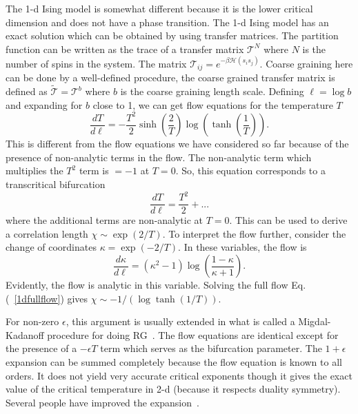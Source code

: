 \documentclass[
 reprint,
 amsmath,amssymb,
 aps, superscriptaddress, pre
]{revtex4-1}
\begin{document}
The 1-d Ising model is somewhat different because it is the lower critical dimension and does not have a phase transition. The 1-d Ising model has an exact solution which can be obtained by using transfer matrices. The partition function can be written as the trace of a transfer matrix $\mathcal{T}^N$ where $N$ is the number of spins in the system. The matrix $\mathcal{T}_{i j} = e^{-\beta \mathcal{H}(s_i s_j)}$. Coarse graining here can be done by a well-defined procedure, the coarse grained transfer matrix is defined as $\tilde{\mathcal{T}} = \mathcal{T}^b$ where $b$ is the coarse graining length scale. Defining $\ell = \log b$ and expanding for $b$ close to 1, we can get flow equations for the temperature $T$
\begin{equation}
 \frac{d T}{d \ell} = - \frac{T^2}{2} \sinh \left(\frac{2}{T} \right) \log \left (\tanh \left(\frac{1}{T}\right) \right) .
 \label{1dfullflow}
\end{equation}
This is different from the flow equations we have considered so far because of the presence of non-analytic terms in the flow. The non-analytic term which multiplies the $T^2$ term is $= -1$ at $T = 0$. So, this equation corresponds to a transcritical bifurcation
\begin{equation}
 \frac{d T}{d \ell} =  \frac{T^2}{2} + ...
\end{equation}
where the additional terms are non-analytic at $T = 0$. This can be used to derive a correlation length $\chi \sim \exp(2/T)$.  To interpret the flow further, consider the change of coordinates $\kappa = \exp(-2/T)$. In these variables, the flow is 
\begin{equation}
 \frac{d \kappa}{d \ell} = (\kappa^2 - 1) \log \left( \frac{1-\kappa}{\kappa + 1} \right) .
\end{equation}
Evidently, the flow is analytic in this variable. Solving the full flow Eq.(~\ref{1dfullflow}) gives $\chi \sim -1/(\log \tanh(1/T))$.

For non-zero $\epsilon$, this argument is usually extended in what is called a Migdal-Kadanoff procedure for doing RG~\cite{kadanoff1976notes, chaikin1995principles}. The flow equations are identical except for the presence of a $- \epsilon T$ term which serves as the bifurcation parameter. The $1+\epsilon$ expansion can be summed completely because the flow equation is known to all orders. It does not yield very accurate critical exponents though it gives the exact value of the critical temperature in 2-d (because it respects duality symmetry). Several people have improved the expansion~\cite{martinelli1981systematical, bruce1981droplet}. 
\end{document}
